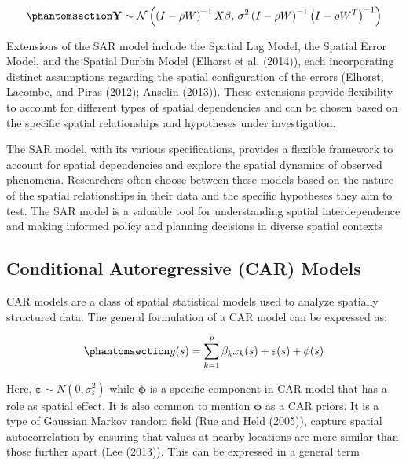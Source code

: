 \documentclass[
  default,
]{sn-jnl}
\begin{document}
\begin{equation}\phantomsection\label{eq-jointysar}{
\mathbf{Y} \sim \mathcal{N}\left( \left( I - \rho W \right)^{-1} X\beta, \, \sigma^2 \left( I - \rho W \right)^{-1} \left( I - \rho W^T \right)^{-1} \right)
}\end{equation}

Extensions of the SAR model include the Spatial Lag Model, the Spatial
Error Model, and the Spatial Durbin Model (Elhorst et al. (2014)), each
incorporating distinct assumptions regarding the spatial configuration
of the errors (Elhorst, Lacombe, and Piras (2012); Anselin (2013)).
These extensions provide flexibility to account for different types of
spatial dependencies and can be chosen based on the specific spatial
relationships and hypotheses under investigation.

The SAR model, with its various specifications, provides a flexible
framework to account for spatial dependencies and explore the spatial
dynamics of observed phenomena. Researchers often choose between these
models based on the nature of the spatial relationships in their data
and the specific hypotheses they aim to test. The SAR model is a
valuable tool for understanding spatial interdependence and making
informed policy and planning decisions in diverse spatial contexts

\subsection{Conditional Autoregressive (CAR)
Models}\label{conditional-autoregressive-car-models}

CAR models are a class of spatial statistical models used to analyze
spatially structured data. The general formulation of a CAR model can be
expressed as:

\begin{equation}\phantomsection\label{eq-car}{
y(s) = \sum_{k=1}^p \beta_k x_k(s) + \varepsilon(s) + \phi(s) 
}\end{equation}

Here, \(\boldsymbol{\varepsilon} \sim N(0, \sigma_{\varepsilon}^2)\)
while \(\boldsymbol{\phi}\) is a specific component in CAR model that
has a role as spatial effect. It is also common to mention
\(\boldsymbol{\phi}\) as a CAR priors. It is a type of Gaussian Markov
random field (Rue and Held (2005)), capture spatial autocorrelation by
ensuring that values at nearby locations are more similar than those
further apart (Lee (2013)). This can be expressed in a general term
\end{document}
